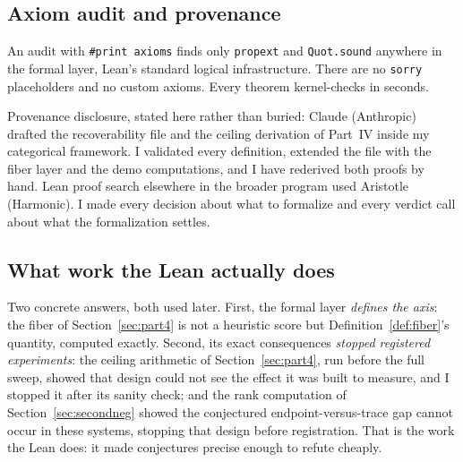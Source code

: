 \subsection{Axiom audit and provenance}

An audit with \texttt{\#print axioms} finds only \texttt{propext} and \texttt{Quot.sound} anywhere in the formal layer, Lean's standard logical infrastructure. There are no \texttt{sorry} placeholders and no custom axioms. Every theorem kernel-checks in seconds.

Provenance disclosure, stated here rather than buried: Claude (Anthropic) drafted the recoverability file and the ceiling derivation of Part~IV inside my categorical framework. I validated every definition, extended the file with the fiber layer and the demo computations, and I have rederived both proofs by hand. Lean proof search elsewhere in the broader program used Aristotle (Harmonic). I made every decision about what to formalize and every verdict call about what the formalization settles.

\subsection{What work the Lean actually does}\label{sec:leanwork}

Two concrete answers, both used later. First, the formal layer \emph{defines the axis}: the fiber of Section~\ref{sec:part4} is not a heuristic score but Definition~\ref{def:fiber}'s quantity, computed exactly. Second, its exact consequences \emph{stopped registered experiments}: the ceiling arithmetic of Section~\ref{sec:part4}, run before the full sweep, showed that design could not see the effect it was built to measure, and I stopped it after its sanity check; and the rank computation of Section~\ref{sec:secondneg} showed the conjectured endpoint-versus-trace gap cannot occur in these systems, stopping that design before registration. That is the work the Lean does: it made conjectures precise enough to refute cheaply.

